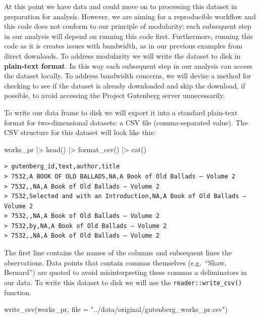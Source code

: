 \documentclass[
  letterpaper,
]{latex/krantz}
\newenvironment{Shaded}{\begin{snugshade}}{\end{snugshade}}
\newcommand{\AttributeTok}[1]{\textcolor[rgb]{0.00,0.00,0.00}{#1}}
\newcommand{\FunctionTok}[1]{\textcolor[rgb]{0.00,0.00,0.00}{#1}}
\newcommand{\NormalTok}[1]{\textcolor[rgb]{0.00,0.00,0.00}{#1}}
\newcommand{\SpecialCharTok}[1]{\textcolor[rgb]{0.00,0.00,0.00}{#1}}
\newcommand{\StringTok}[1]{\textcolor[rgb]{0.00,0.00,0.00}{#1}}
\begin{document}
At this point we have data and could move on to processing this dataset
in preparation for analysis. However, we are aiming for a reproducible
workflow and this code does not conform to our principle of modularity:
each subsequent step in our analysis will depend on running this code
first. Furthermore, running this code as it is creates issues with
bandwidth, as in our previous examples from direct downloads. To address
modularity we will write the dataset to disk in \textbf{plain-text
format}. In this way each subsequent step in our analysis can access the
dataset locally. To address bandwidth concerns, we will devise a method
for checking to see if the dataset is already downloaded and skip the
download, if possible, to avoid accessing the Project Gutenberg server
unnecessarily.

To write our data frame to disk we will export it into a standard
plain-text format for two-dimensional datasets: a CSV file
(comma-separated value). The CSV structure for this dataset will look
like this:

\begin{Shaded}
\begin{Highlighting}[]
\NormalTok{works\_pr }\SpecialCharTok{|\textgreater{}} \FunctionTok{head}\NormalTok{() }\SpecialCharTok{|\textgreater{}} \FunctionTok{format\_csv}\NormalTok{() }\SpecialCharTok{|\textgreater{}} \FunctionTok{cat}\NormalTok{()}
\end{Highlighting}
\end{Shaded}

\begin{verbatim}
> gutenberg_id,text,author,title
> 7532,A BOOK OF OLD BALLADS,NA,A Book of Old Ballads — Volume 2
> 7532,,NA,A Book of Old Ballads — Volume 2
> 7532,Selected and with an Introduction,NA,A Book of Old Ballads — Volume 2
> 7532,,NA,A Book of Old Ballads — Volume 2
> 7532,by,NA,A Book of Old Ballads — Volume 2
> 7532,,NA,A Book of Old Ballads — Volume 2
\end{verbatim}

The first line contains the names of the columns and subsequent lines
the observations. Data points that contain commas themselves
(e.g.~``Shaw, Bernard'') are quoted to avoid misinterpreting these
commas a deliminators in our data. To write this dataset to disk we will
use the \texttt{reader::write\_csv()} function.

\begin{Shaded}
\begin{Highlighting}[]
\FunctionTok{write\_csv}\NormalTok{(works\_pr, }\AttributeTok{file =} \StringTok{"../data/original/gutenberg\_works\_pr.csv"}\NormalTok{)}
\end{Highlighting}
\end{Shaded}
\end{document}
